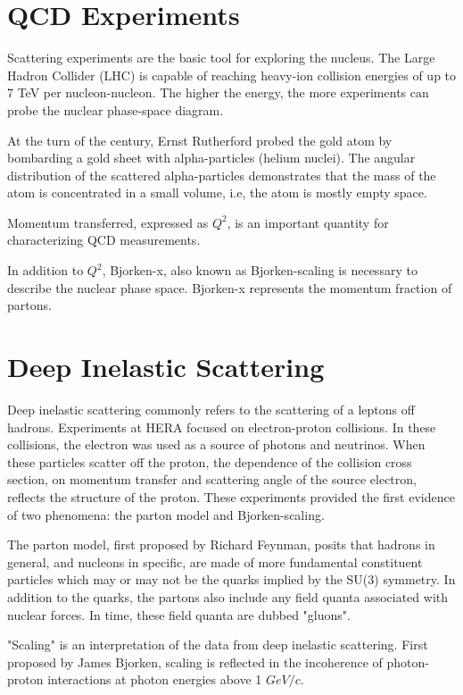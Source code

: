 \section{QCD Experiments}

Scattering experiments are the basic tool for exploring the nucleus. The Large Hadron Collider (LHC) is capable of reaching heavy-ion collision energies of up to 7 TeV per nucleon-nucleon. The higher the energy, the more experiments can probe the nuclear phase-space diagram.

At the turn of the century, Ernst Rutherford probed the gold atom by bombarding a gold sheet with alpha-particles (helium nuclei). The angular distribution of the scattered alpha-particles demonstrates that the mass of the atom is concentrated in a small volume, i.e, the atom is mostly empty space. 

Momentum transferred, expressed as $Q^2$, is an important quantity for characterizing QCD measurements. 

In addition to $Q^2$, Bjorken-x, also known as Bjorken-scaling is necessary to describe the nuclear phase space. Bjorken-x represents the momentum fraction of partons. 

\section{Deep Inelastic Scattering}

Deep inelastic scattering commonly refers to the scattering of a leptons off hadrons. Experiments at HERA focused on electron-proton collisions. In these collisions, the electron was used as a source of photons and neutrinos. When these particles scatter off the proton, the dependence of the collision cross section, on momentum transfer and scattering angle of the source electron, reflects the structure of the proton. These experiments provided the first evidence of two phenomena: the parton model and Bjorken-scaling. 

The parton model, first proposed by Richard Feynman, posits that hadrons in general, and nucleons in specific, are made of more fundamental constituent particles which may or may not be the quarks implied by the SU(3) symmetry. In addition to the quarks, the partons also include any field quanta associated with nuclear forces. In time, these field quanta are dubbed "gluons".

"Scaling" is an interpretation of the data from deep inelastic scattering. First proposed by James Bjorken, scaling is reflected in the incoherence of photon-proton interactions at photon energies above 1 $GeV/c$.

